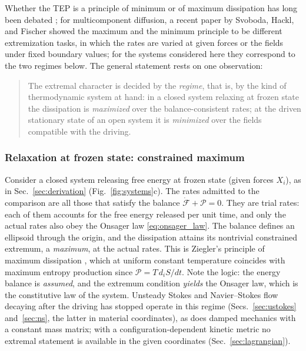 \documentclass[aip,pof,reprint,amsmath,amssymb,longbibliography]{revtex4-2}
\begin{document}
Whether the TEP is a principle of minimum or of maximum dissipation has long been debated \cite{martyushev2006, struchtrup1998, polettini2013}; for multicomponent diffusion, a recent paper by Svoboda, Hackl, and Fischer \cite{svoboda2023note} showed the maximum and the minimum principle to be different extremization tasks, in which the rates are varied at given forces or the fields under fixed boundary values; for the systems considered here they correspond to the two regimes below. The general statement rests on one observation:
\begin{quote}
    The extremal character is decided by the \textit{regime}, that is, by the kind of thermodynamic system at hand: in a closed system relaxing at frozen state the dissipation is \textit{maximized} over the balance-consistent rates; at the driven stationary state of an open system it is \textit{minimized} over the fields compatible with the driving.
\end{quote}

\subsubsection{Relaxation at frozen state: constrained maximum}
\label{sec:relaxation}

Consider a closed system releasing free energy at frozen state (given forces $X_i$), as in Sec.~\ref{sec:derivation} (Fig.~\ref{fig:systems}c). The rates admitted to the comparison are all those that satisfy the balance $\dot{\mathcal{F}} + \mathcal{P} = 0$. They are trial rates: each of them accounts for the free energy released per unit time, and only the actual rates also obey the Onsager law \eqref{eq:onsager_law}. The balance defines an ellipsoid through the origin, and the dissipation attains its nontrivial constrained extremum, a \textit{maximum}, at the actual rates. This is Ziegler's principle of maximum dissipation \cite{ziegler1963}, which at uniform constant temperature coincides with maximum entropy production \cite{martyushev2006} since $\mathcal{P} = T\, d_i S/dt$. Note the logic: the energy balance is \textit{assumed}, and the extremum condition \textit{yields} the Onsager law, which is the constitutive law of the system. Unsteady Stokes and Navier--Stokes flow decaying after the driving has stopped operate in this regime (Secs.~\ref{sec:ustokes} and~\ref{sec:ns}, the latter in material coordinates), as does damped mechanics with a constant mass matrix; with a configuration-dependent kinetic metric no extremal statement is available in the given coordinates (Sec.~\ref{sec:lagrangian}).
\end{document}
